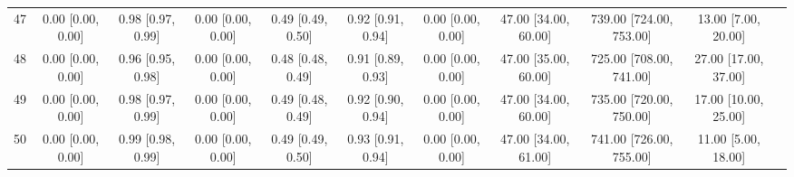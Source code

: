 \documentclass[8pt]{article}
\begin{document}
\begin{center}
\begin{footnotesize}
\begin{longtable}{|ccccccccccc|}
 47 &  0.00 [0.00, 0.00] &  0.98 [0.97, 0.99] &  0.00 [0.00, 0.00] &  0.49 [0.49, 0.50] &  0.92 [0.91, 0.94] &     0.00 [0.00, 0.00] &  47.00 [34.00, 60.00] &  739.00 [724.00, 753.00] &      13.00 [7.00, 20.00] \\
 48 &  0.00 [0.00, 0.00] &  0.96 [0.95, 0.98] &  0.00 [0.00, 0.00] &  0.48 [0.48, 0.49] &  0.91 [0.89, 0.93] &     0.00 [0.00, 0.00] &  47.00 [35.00, 60.00] &  725.00 [708.00, 741.00] &     27.00 [17.00, 37.00] \\
 49 &  0.00 [0.00, 0.00] &  0.98 [0.97, 0.99] &  0.00 [0.00, 0.00] &  0.49 [0.48, 0.49] &  0.92 [0.90, 0.94] &     0.00 [0.00, 0.00] &  47.00 [34.00, 60.00] &  735.00 [720.00, 750.00] &     17.00 [10.00, 25.00] \\
 50 &  0.00 [0.00, 0.00] &  0.99 [0.98, 0.99] &  0.00 [0.00, 0.00] &  0.49 [0.49, 0.50] &  0.93 [0.91, 0.94] &     0.00 [0.00, 0.00] &  47.00 [34.00, 61.00] &  741.00 [726.00, 755.00] &      11.00 [5.00, 18.00] \\
\end{longtable}
\end{footnotesize}
\end{center}
\end{document}
